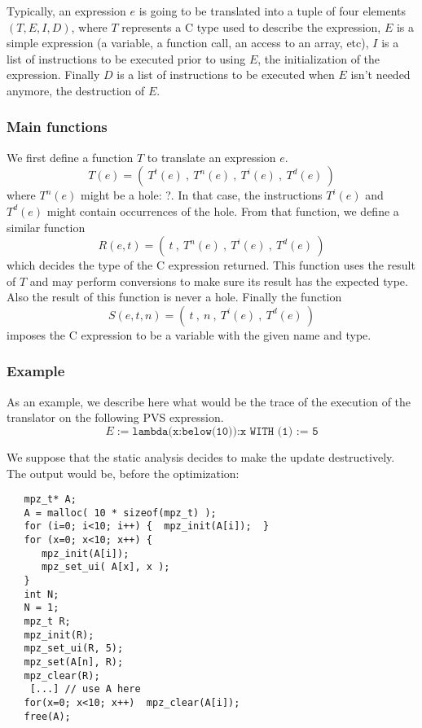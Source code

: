 \documentclass[12pt,a4paper]{article}
\newcommand{\cl}[1]{\texttt{#1}}
\begin{document}
Typically, an expression $e$ is going to be translated into a tuple of four elements $(T,E,I,D)$, where $T$ represents a C type used to describe the expression, $E$ is a simple expression (a variable, a function call, an access to an array, etc), $I$ is a list of instructions to be executed prior to using $E$, the initialization of the expression. Finally $D$ is a list of instructions to be executed when $E$ isn't needed anymore, the destruction of $E$.


\subsubsection*{Main functions}

We first define a function $T$ to translate an expression $e$.
$$ T(e) = ( \ T^t(e) \ , \ T^n(e) \ , \ T^i(e) \ , \ T^d(e) \ ) $$
where $T^n(e)$ might be a hole: ?. In that case, the instructions $T^i(e)$ and $T^d(e)$ might contain occurrences of the hole.
From that function, we define a similar function
$$ R(e, t) = ( \ t \ , \ T^n(e) \ , \ T^i(e) \ , \ T^d(e) \ ) $$
which decides the type of the C expression returned. This function uses the result of $T$ and may perform conversions to make sure its result has the expected type. Also the result of this function is never a hole. Finally the function
$$ S(e, t, n) = ( \ t \ , \ n \ , \ T^i(e) \ , \ T^d(e) \ ) $$
imposes the C expression to be a variable with the given name and type.

\subsubsection*{Example}

As an example, we describe here what would be the trace of the execution of the translator on the following PVS expression.
$$ E := \cl{lambda(x:below(10)):x WITH (1) := 5} $$

We suppose that the static analysis decides to make the update destructively. The output would be, before the optimization:

\begin{lstlisting}
   mpz_t* A;
   A = malloc( 10 * sizeof(mpz_t) );
   for (i=0; i<10; i++) {  mpz_init(A[i]);  }
   for (x=0; x<10; x++) {
      mpz_init(A[i]);
      mpz_set_ui( A[x], x );
   }
   int N;
   N = 1;
   mpz_t R;
   mpz_init(R);
   mpz_set_ui(R, 5);
   mpz_set(A[n], R);
   mpz_clear(R);
    [...] // use A here
   for(x=0; x<10; x++)  mpz_clear(A[i]);
   free(A);
\end{lstlisting}
\end{document}
